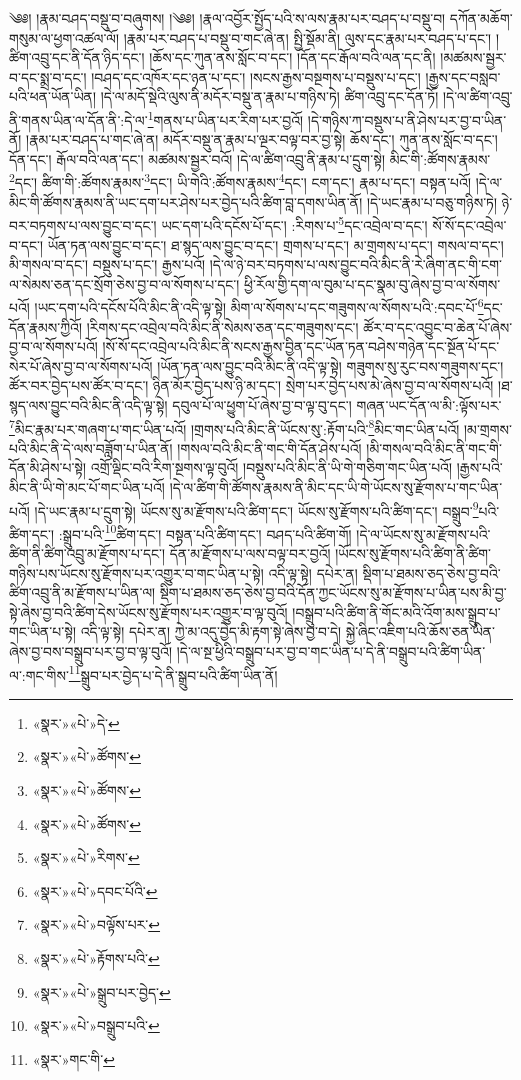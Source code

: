 ༄༅། །རྣམ་བཤད་བསྡུ་བ་བཞུགས། །༄༅། །རྣལ་འབྱོར་སྤྱོད་པའི་ས་ལས་རྣམ་པར་བཤད་པ་བསྡུ་བ། དཀོན་མཆོག་གསུམ་ལ་ཕྱག་འཚལ་ལོ། །རྣམ་པར་བཤད་པ་བསྡུ་བ་གང་ཞེ་ན། སྤྱི་སྡོམ་ནི། ལུས་དང་རྣམ་པར་བཤད་པ་དང་། །ཚིག་འབྲུ་དང་ནི་དོན་ཉིད་དང་། །ཆོས་དང་ཀུན་ནས་སློང་བ་དང་། །དོན་དང་རྒོལ་བའི་ལན་དང་ནི། །མཚམས་སྦྱར་བ་དང་སྨྲ་བ་དང་། །བཤད་དང་འཁོར་དང་ཉན་པ་དང་། །སངས་རྒྱས་བསྔགས་པ་བསྡུས་པ་དང་། །རྒྱས་དང་བསླབ་པའི་ཕན་ཡོན་ཡིན། །དེ་ལ་མདོ་སྡེའི་ལུས་ནི་མདོར་བསྡུ་ན་རྣམ་པ་གཉིས་ཏེ། ཚིག་འབྲུ་དང་དོན་ཏོ། །དེ་ལ་ཚིག་འབྲུ་ནི་གནས་ཡིན་ལ་དོན་ནི་:དེ་ལ་\footnote{«སྣར་»«པེ་»དེ་}གནས་པ་ཡིན་པར་རིག་པར་བྱའོ། །དེ་གཉིས་ཀ་བསྡུས་པ་ནི་ཤེས་པར་བྱ་བ་ཡིན་ནོ། །རྣམ་པར་བཤད་པ་གང་ཞེ་ན། མདོར་བསྡུ་ན་རྣམ་པ་ལྔར་བལྟ་བར་བྱ་སྟེ། ཆོས་དང་། ཀུན་ནས་སློང་བ་དང་། དོན་དང་། རྒོལ་བའི་ལན་དང་། མཚམས་སྦྱར་བའོ། །དེ་ལ་ཚིག་འབྲུ་ནི་རྣམ་པ་དྲུག་སྟེ། མིང་གི་:ཚོགས་རྣམས་\footnote{«སྣར་»«པེ་»ཚོགས་}དང་། ཚིག་གི་:ཚོགས་རྣམས་\footnote{«སྣར་»«པེ་»ཚོགས་}དང་། ཡི་གེའི་:ཚོགས་རྣམས་\footnote{«སྣར་»«པེ་»ཚོགས་}དང་། ངག་དང་། རྣམ་པ་དང་། བསྟན་པའོ། །དེ་ལ་མིང་གི་ཚོགས་རྣམས་ནི་ཡང་དག་པར་ཤེས་པར་བྱེད་པའི་ཚིག་བླ་དགས་ཡིན་ནོ། །དེ་ཡང་རྣམ་པ་བཅུ་གཉིས་ཏེ། ཉེ་བར་བཏགས་པ་ལས་བྱུང་བ་དང་། ཡང་དག་པའི་དངོས་པོ་དང་། :རིགས་པ་\footnote{«སྣར་»«པེ་»རིགས་}དང་འབྲེལ་བ་དང་། སོ་སོ་དང་འབྲེལ་བ་དང་། ཡོན་ཏན་ལས་བྱུང་བ་དང་། ཐ་སྙད་ལས་བྱུང་བ་དང་། གྲགས་པ་དང་། མ་གྲགས་པ་དང་། གསལ་བ་དང་། མི་གསལ་བ་དང་། བསྡུས་པ་དང་། རྒྱས་པའོ། །དེ་ལ་ཉེ་བར་བཏགས་པ་ལས་བྱུང་བའི་མིང་ནི་རེ་ཞིག་ནང་གི་ངག་ལ་སེམས་ཅན་དང་སྲོག་ཅེས་བྱ་བ་ལ་སོགས་པ་དང་། ཕྱི་རོལ་གྱི་དག་ལ་བུམ་པ་དང་སྣམ་བུ་ཞེས་བྱ་བ་ལ་སོགས་པའོ། །ཡང་དག་པའི་དངོས་པོའི་མིང་ནི་འདི་ལྟ་སྟེ། མིག་ལ་སོགས་པ་དང་གཟུགས་ལ་སོགས་པའི་:དབང་པོ་\footnote{«སྣར་»«པེ་»དབང་པོའི་}དང་དོན་རྣམས་ཀྱིའོ། །རིགས་དང་འབྲེལ་བའི་མིང་ནི་སེམས་ཅན་དང་གཟུགས་དང་། ཚོར་བ་དང་འབྱུང་བ་ཆེན་པོ་ཞེས་བྱ་བ་ལ་སོགས་པའོ། །སོ་སོ་དང་འབྲེལ་པའི་མིང་ནི་སངས་རྒྱས་བྱིན་དང་ཡོན་ཏན་བཤེས་གཉེན་དང་སྔོན་པོ་དང་སེར་པོ་ཞེས་བྱ་བ་ལ་སོགས་པའོ། །ཡོན་ཏན་ལས་བྱུང་བའི་མིང་ནི་འདི་ལྟ་སྟེ། གཟུགས་སུ་རུང་བས་གཟུགས་དང་། ཚོར་བར་བྱེད་པས་ཚོར་བ་དང་། ཉིན་མོར་བྱེད་པས་ཉི་མ་དང་། སྲེག་པར་བྱེད་པས་མེ་ཞེས་བྱ་བ་ལ་སོགས་པའོ། །ཐ་སྙད་ལས་བྱུང་བའི་མིང་ནི་འདི་ལྟ་སྟེ། དབུལ་པོ་ལ་ཕྱུག་པོ་ཞེས་བྱ་བ་ལྟ་བུ་དང་། གཞན་ཡང་དོན་ལ་མི་:ལྟོས་པར་\footnote{«སྣར་»«པེ་»བལྟོས་པར་}མིང་རྣམ་པར་གཞག་པ་གང་ཡིན་པའོ། །གྲགས་པའི་མིང་ནི་ཡོངས་སུ་:རྟོག་པའི་\footnote{«སྣར་»«པེ་»རྟོགས་པའི་}མིང་གང་ཡིན་པའོ། །མ་གྲགས་པའི་མིང་ནི་དེ་ལས་བཟློག་པ་ཡིན་ནོ། །གསལ་བའི་མིང་ནི་གང་གི་དོན་ཤེས་པའོ། །མི་གསལ་བའི་མིང་ནི་གང་གི་དོན་མི་ཤེས་པ་སྟེ། འགྲོ་ལྡིང་བའི་རིག་སྔགས་ལྟ་བུའོ། །བསྡུས་པའི་མིང་ནི་ཡི་གེ་གཅིག་གང་ཡིན་པའོ། །རྒྱས་པའི་མིང་ནི་ཡི་གེ་མང་པོ་གང་ཡིན་པའོ། །དེ་ལ་ཚིག་གི་ཚོགས་རྣམས་ནི་མིང་དང་ཡི་གེ་ཡོངས་སུ་རྫོགས་པ་གང་ཡིན་པའོ། །དེ་ཡང་རྣམ་པ་དྲུག་སྟེ། ཡོངས་སུ་མ་རྫོགས་པའི་ཚིག་དང་། ཡོངས་སུ་རྫོགས་པའི་ཚིག་དང་། བསྒྲུབ་\footnote{«སྣར་»«པེ་»སྒྲུབ་པར་བྱེད་}པའི་ཚིག་དང་། :སྒྲུབ་པའི་\footnote{«སྣར་»«པེ་»བསྒྲུབ་པའི་}ཚིག་དང་། བསྟན་པའི་ཚིག་དང་། བཤད་པའི་ཚིག་གོ། །དེ་ལ་ཡོངས་སུ་མ་རྫོགས་པའི་ཚིག་ནི་ཚིག་འབྲུ་མ་རྫོགས་པ་དང་། དོན་མ་རྫོགས་པ་ལས་བལྟ་བར་བྱའོ། །ཡོངས་སུ་རྫོགས་པའི་ཚིག་ནི་ཚིག་གཉིས་པས་ཡོངས་སུ་རྫོགས་པར་འགྱུར་བ་གང་ཡིན་པ་སྟེ། འདི་ལྟ་སྟེ། དཔེར་ན། སྡིག་པ་ཐམས་ཅད་ཅེས་བྱ་བའི་ཚིག་འབྲུ་ནི་མ་རྫོགས་པ་ཡིན་ལ། སྡིག་པ་ཐམས་ཅད་ཅེས་བྱ་བའི་དོན་ཀྱང་ཡོངས་སུ་མ་རྫོགས་པ་ཡིན་པས་མི་བྱ་སྟེ་ཞེས་བྱ་བའི་ཚིག་དེས་ཡོངས་སུ་རྫོགས་པར་འགྱུར་བ་ལྟ་བུའོ། །བསྒྲུབ་པའི་ཚིག་ནི་གོང་མའི་འོག་མས་སྒྲུབ་པ་གང་ཡིན་པ་སྟེ། འདི་ལྟ་སྟེ། དཔེར་ན། ཀྱེ་མ་འདུ་བྱེད་མི་རྟག་སྟེ་ཞེས་བྱ་བ་དེ། སྐྱེ་ཞིང་འཇིག་པའི་ཆོས་ཅན་ཡིན་ཞེས་བྱ་བས་བསྒྲུབ་པར་བྱ་བ་ལྟ་བུའོ། །དེ་ལ་སྔ་ཕྱིའི་བསྒྲུབ་པར་བྱ་བ་གང་ཡིན་པ་དེ་ནི་བསྒྲུབ་པའི་ཚིག་ཡིན་ལ་:གང་གིས་\footnote{«སྣར་»གང་གི་}སྒྲུབ་པར་བྱེད་པ་དེ་ནི་སྒྲུབ་པའི་ཚིག་ཡིན་ནོ། 